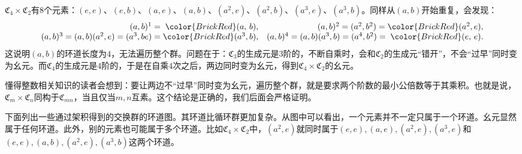 \documentclass[12pt,UTF8,fontset=none]{ctexbook}
\begin{document}
$\mathfrak{C}_4\times \mathfrak{C}_2$有$8$个元素：$(e,e)$、$(e,b)$、$(a,e)$、$(a,b)$、$(a^2,e)$、$(a^2,b)$、$(a^3,e)$、$(a^3,b)$。同样从$(a,b)$开始重复，会发现：
\[
\begin{array}{rr}
    (a,b)^1 =\; {\color{BrickRed}(a,\,b)}, &(a,b)^2 = (a^2,b^2) = {\color{BrickRed}(a^2,e)}, \\ (a,b)^3 = (a,b)(a^2,e) = (a^3,be) = {\color{BrickRed}(a^3,b)}, &
    (a,b)^4 = (a,b)(a^3,b) = (a^4,b^2) = \;{\color{BrickRed}(e,\,e)}.
\end{array}
\]
这说明$(a,b)$的环道长度为$4$，无法遍历整个群。问题在于：$\mathfrak{C}_3$的生成元是$3$阶的，不断自乘时，会和$\mathfrak{C}_2$的生成元“错开”，不会“过早”同时变为幺元。而$\mathfrak{C}_4$的生成元是$4$阶的，于是在自乘$4$次之后，两边同时变为幺元，得到$\mathfrak{C}_4\times \mathfrak{C}_2$的幺元。

懂得整数相关知识的读者会想到：要让两边不“过早”同时变为幺元，遍历整个群，就是要求两个阶数的最小公倍数等于其乘积。也就是说，$\mathfrak{C}_m\times \mathfrak{C}_n$同构于$\mathfrak{C}_{mn}$，当且仅当$m,n$互素。这个结论是正确的，我们后面会严格证明。

下面列出一些通过架积得到的交换群的环道图。其环道比循环群更加复杂。从图中可以看出，一个元素并不一定只属于一个环道。幺元显然属于任何环道。此外，别的元素也可能属于多个环道。比如$\mathfrak{C}_4\times\mathfrak{C}_2$中，$(a^2, e)$就同时属于$(e,e),(a,e),(a^2,e),(a^3,e)$和$(e,e),(a,b),(a^2,e),(a^3,b)$这两个环道。
\end{document}
